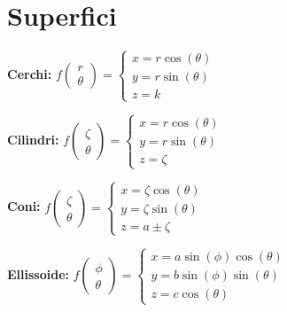 \documentclass[a4paper,portrait,columns=3,5pt]{cheatsheet}
\begin{document}
\section{Superfici}

\textbf{Cerchi:} $f\begin{pmatrix}r\\\theta\end{pmatrix} = \begin{cases}x = r \cos(\theta)\\y = r\sin(\theta)\\z = k\end{cases}$

\textbf{Cilindri:} $f\begin{pmatrix}\zeta\\\theta\end{pmatrix} = \begin{cases}x = r \cos(\theta)\\y = r\sin(\theta)\\z = \zeta\end{cases}$

\textbf{Coni:} $f\begin{pmatrix}\zeta\\\theta\end{pmatrix} = \begin{cases}x = \zeta \cos(\theta)\\y = \zeta \sin(\theta)\\z = a \pm \zeta \end{cases}$

\textbf{Ellissoide:} $f\begin{pmatrix}\phi\\\theta\end{pmatrix} = \begin{cases}x = a  \sin(\phi) \cos(\theta)\\y = b \sin(\phi) \sin(\theta)\\z = c \cos(\theta) \end{cases}$
\end{document}

